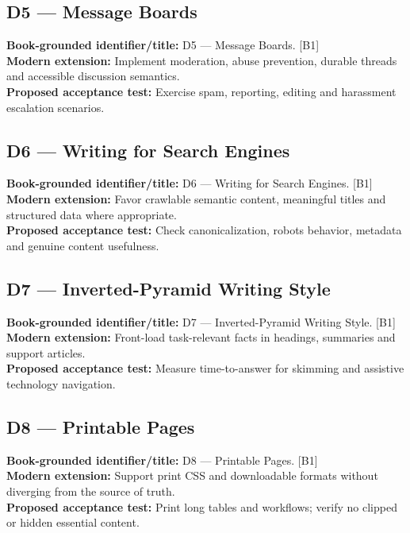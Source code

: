 \documentclass[11pt]{article}
\begin{document}
\subsection{D5 — Message Boards}
\noindent\textcolor{Ocean}{\textbf{Book-grounded identifier/title:}} D5 — Message Boards. [B1]\\
\textcolor{Mint}{\textbf{Modern extension:}} Implement moderation, abuse prevention, durable threads and accessible discussion semantics.\\
\textcolor{Amber}{\textbf{Proposed acceptance test:}} Exercise spam, reporting, editing and harassment escalation scenarios.\medskip
\subsection{D6 — Writing for Search Engines}
\noindent\textcolor{Ocean}{\textbf{Book-grounded identifier/title:}} D6 — Writing for Search Engines. [B1]\\
\textcolor{Mint}{\textbf{Modern extension:}} Favor crawlable semantic content, meaningful titles and structured data where appropriate.\\
\textcolor{Amber}{\textbf{Proposed acceptance test:}} Check canonicalization, robots behavior, metadata and genuine content usefulness.\medskip
\subsection{D7 — Inverted-Pyramid Writing Style}
\noindent\textcolor{Ocean}{\textbf{Book-grounded identifier/title:}} D7 — Inverted-Pyramid Writing Style. [B1]\\
\textcolor{Mint}{\textbf{Modern extension:}} Front-load task-relevant facts in headings, summaries and support articles.\\
\textcolor{Amber}{\textbf{Proposed acceptance test:}} Measure time-to-answer for skimming and assistive technology navigation.\medskip
\subsection{D8 — Printable Pages}
\noindent\textcolor{Ocean}{\textbf{Book-grounded identifier/title:}} D8 — Printable Pages. [B1]\\
\textcolor{Mint}{\textbf{Modern extension:}} Support print CSS and downloadable formats without diverging from the source of truth.\\
\textcolor{Amber}{\textbf{Proposed acceptance test:}} Print long tables and workflows; verify no clipped or hidden essential content.\medskip
\end{document}
